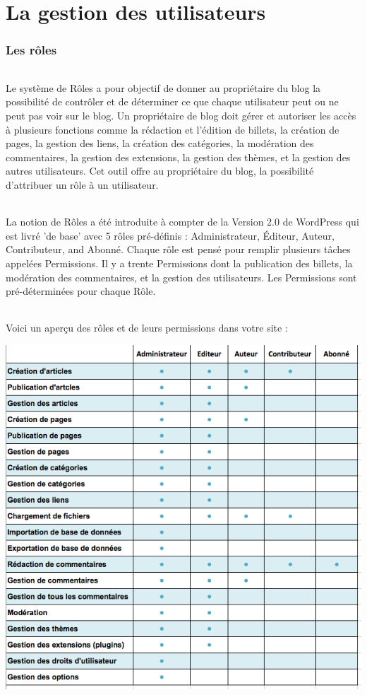 \documentclass[10pt,a4paper]{article}
\begin{document}
\part{La gestion des utilisateurs}
\newpage
\section{Les rôles}
\paragraph{}Le système de Rôles a pour objectif de donner au propriétaire du blog la possibilité de contrôler et de déterminer ce que chaque utilisateur peut ou ne peut pas voir sur le blog. Un propriétaire de blog doit gérer et autoriser les accès à plusieurs fonctions comme la rédaction et l'édition de billets, la création de pages, la gestion des liens, la création des catégories, la modération des commentaires, la gestion des extensions, la gestion des thèmes, et la gestion des autres utilisateurs. Cet outil offre au propriétaire du blog, la possibilité d'attribuer un rôle à un utilisateur. 
\paragraph{}La notion de Rôles a été introduite à compter de la Version 2.0 de WordPress qui est livré 'de base' avec 5 rôles pré-définis : Administrateur, Éditeur, Auteur, Contributeur, and Abonné. Chaque rôle est pensé pour remplir plusieurs tâches appelées Permissions. Il y a trente Permissions dont la publication des billets, la modération des commentaires, et la gestion des utilisateurs. Les Permissions sont pré-déterminées pour chaque Rôle.
\paragraph{}Voici un aperçu des rôles et de leurs permissions dans votre site :
\begin{center}
\includegraphics[scale=0.5]{img/0156.png}
\end{center}
\newpage
\end{document}
